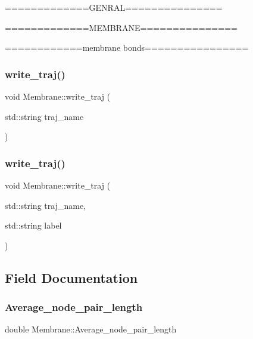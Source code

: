 =============G\+E\+N\+R\+AL===============

=============M\+E\+M\+B\+R\+A\+NE===============

============membrane bonds================ \mbox{\label{classMembrane_a74ebace0e97952e966f1fe3babf420a7}} 
\subsubsection{\texorpdfstring{write\_traj()}{write\_traj()}\hspace{0.1cm}{\footnotesize\ttfamily [1/2]}}
{\footnotesize\ttfamily void Membrane\+::write\+\_\+traj (\begin{DoxyParamCaption}\item[{std\+::string}]{traj\+\_\+name }\end{DoxyParamCaption})}

\mbox{\label{classMembrane_ace8dd26e72369937db74fadcab2726aa}} 
\subsubsection{\texorpdfstring{write\_traj()}{write\_traj()}\hspace{0.1cm}{\footnotesize\ttfamily [2/2]}}
{\footnotesize\ttfamily void Membrane\+::write\+\_\+traj (\begin{DoxyParamCaption}\item[{std\+::string}]{traj\+\_\+name,  }\item[{std\+::string}]{label }\end{DoxyParamCaption})}



\subsection{Field Documentation}
\mbox{\label{classMembrane_ae80a22b9f52cc51918d78269af4a2061}} 
\subsubsection{\texorpdfstring{Average\_node\_pair\_length}{Average\_node\_pair\_length}}
{\footnotesize\ttfamily double Membrane\+::\+Average\+\_\+node\+\_\+pair\+\_\+length}

